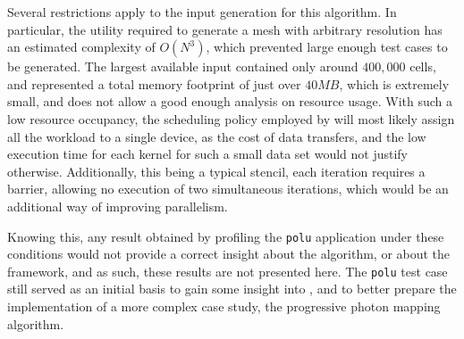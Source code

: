 \documentclass[main.tex]{subfiles}
\begin{document}
Several restrictions apply to the input generation for this algorithm. In particular, the utility required to generate a mesh with arbitrary resolution has an estimated complexity of $O(N^3)$, which prevented large enough test cases to be generated. The largest available input contained only around $400,000$ cells, and represented a total memory footprint of just over $40MB$, which is extremely small, and does not allow a good enough analysis on resource usage. With such a low resource occupancy, the scheduling policy employed by \gama will most likely assign all the workload to a single device, as the cost of data transfers, and the low execution time for each kernel for such a small data set would not justify otherwise. Additionally, this being a typical stencil, each iteration requires a barrier, allowing no execution of two simultaneous iterations, which would be an additional way of improving parallelism.

Knowing this, any result obtained by profiling the \texttt{polu} application under these conditions would not provide a correct insight about the algorithm, or about the framework, and as such, these results are not presented here.
The \texttt{polu} test case still served as an initial basis to gain some insight into \gama, and to better prepare the implementation of a more complex case study, the progressive photon mapping algorithm.
\end{document}
